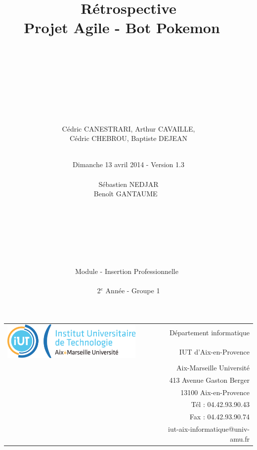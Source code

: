 \documentclass[12pt]{article}
\begin{document}
\title{ ~\\~\\~\\Rétrospective\\\small{Projet Agile - Bot Pokemon} ~\\~\\~\\~\\~\\}

\author{Cédric CANESTRARI, Arthur CAVAILLE,\\ Cédric CHEBROU, Baptiste DEJEAN}
\date{~\\Dimanche 13 avril 2014 - Version 1.3\\
	~\\
	Sébastien NEDJAR\\
	Benoît GANTAUME
	~\\~\\~\\~\\~\\~\\~\\
	~\\Module - Insertion Professionnelle~\\
	~\\2$^e$ Année - Groupe 1
	}
\footnotesize{
	\begin{tabular}{lp{2cm}r}
		  \multirow{2}{*}{\includegraphics[width=7cm]{LOGO-IUT-AMU.png}} && Département informatique \\
            && IUT d'Aix-en-Provence \\
            && Aix-Marseille Université \\
            && 413 Avenue Gaston Berger \\
            && 13100 Aix-en-Provence \\
            && Tél : 04.42.93.90.43 \\
            && Fax : 04.42.93.90.74 \\
            && iut-aix-informatique@univ-amu.fr 
    	\end{tabular}
}{\let\newpage\relax\maketitle} %
\newpage
{} %
\end{document}

